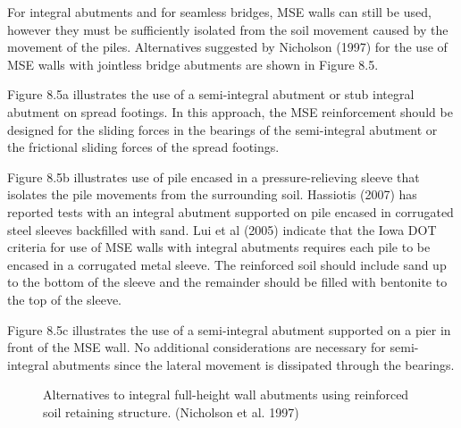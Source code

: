 For integral abutments and for seamless bridges, MSE walls can still be used, however they must be sufficiently
isolated from the soil movement caused by the movement of the piles. Alternatives suggested by Nicholson (1997)
for the use of MSE walls with jointless bridge abutments are shown in Figure 8.5.

Figure 8.5a illustrates the use of a semi-integral abutment or stub integral abutment on spread footings. In this
approach, the MSE reinforcement should be designed for the sliding forces in the bearings of the semi-integral
abutment or the frictional sliding forces of the spread footings.

Figure 8.5b illustrates use of pile encased in a pressure-relieving sleeve that isolates the pile movements from the
surrounding soil. Hassiotis (2007) has reported tests with an integral abutment supported on pile encased in
corrugated steel sleeves backfilled with sand. Lui et al (2005) indicate that the Iowa DOT criteria for use of MSE
walls with integral abutments requires each pile to be encased in a corrugated metal sleeve. The reinforced soil should
include sand up to the bottom of the sleeve and the remainder should be filled with bentonite to the top of the sleeve.

Figure 8.5c illustrates the use of a semi-integral abutment supported on a pier in front of the MSE wall. No
additional considerations are necessary for semi-integral abutments since the lateral movement is dissipated through
the bearings.

\begin{figure}
  \caption{Alternatives to integral full-height wall abutments using reinforced soil retaining structure. (Nicholson et
  al. 1997)}\label{fig:integral-full-height-wall}
\end{figure}


